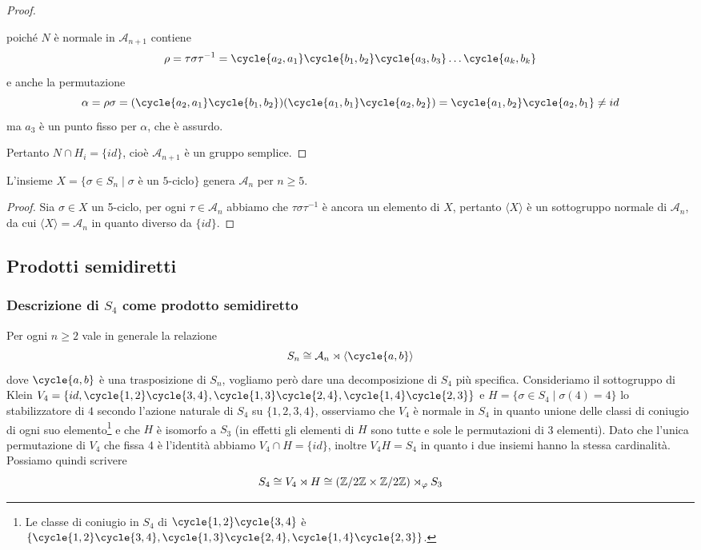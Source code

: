 \documentclass[11pt]{scrartcl}
\begin{document}
\begin{proof}
\begin{itemize}
        poiché $N$ è normale in $\mathcal{A}_{n + 1}$ contiene
        \[
            \rho = \tau\sigma\tau^{-1} = \cycle{a_2, a_1}\cycle{b_1, b_2}
            \cycle{a_3, b_3}\ldots\cycle{a_k, b_k}
        \]
        e anche la permutazione 
        \[
            \alpha = \rho\sigma = (\cycle{a_2, a_1}\cycle{b_1, b_2})
            (\cycle{a_1, b_1}\cycle{a_2, b_2}) = \cycle{a_1, b_2}\cycle{a_2, b_1} \neq id
        \]
        ma $a_3$ è un punto fisso per $\alpha$, che è assurdo.
    \end{itemize}
    Pertanto $N\cap H_i = \{id\}$, cioè $\mathcal{A}_{n + 1}$ è un gruppo semplice.
\end{proof}

\begin{corollary}
    L'insieme $X = \{\sigma \in S_n\mid \sigma \text{ è un 5-ciclo}\}$ genera
    $\mathcal{A}_n$ per $n \geqslant 5$.
\end{corollary}

\begin{proof}
    Sia $\sigma \in X$ un 5-ciclo, per ogni $\tau \in \mathcal{A}_n$
    abbiamo che $\tau\sigma\tau^{-1}$ è ancora un elemento di $X$, pertanto
    $\langle X\rangle$ è un sottogruppo normale di $\mathcal{A}_n$, da cui 
    $\langle X \rangle = \mathcal{A}_n$ in quanto diverso da $\{id\}$.
\end{proof}

\newpage

\subsection{Prodotti semidiretti}

\subsubsection{Descrizione di $S_4$ come prodotto semidiretto}

Per ogni $n \geq 2$ vale in generale la relazione 
\[
    S_n \cong \mathcal{A}_n \rtimes \langle\cycle{a, b}\rangle
\]
dove $\cycle{a, b}$ è una trasposizione di $S_n$, vogliamo però dare una
decomposizione di $S_4$ più specifica. \newline
Consideriamo il sottogruppo di Klein $V_4 = \{id, \cycle{1, 2}\cycle{3, 4}, \cycle{1, 3}\cycle{2, 4},
\cycle{1, 4}\cycle{2, 3}\}$ e $H = \{\sigma \in S_4\mid \sigma(4) = 4\}$ lo 
stabilizzatore di $4$ secondo l'azione naturale di $S_4$ su $\{1, 2, 3, 4\}$,
osserviamo che $V_4$ è normale in $S_4$ in quanto
unione delle classi di coniugio di ogni suo elemento\footnote{
    Le classe di coniugio in $S_4$ di $\cycle{1, 2}\cycle{3, 4}$ è 
    $\{\cycle{1, 2}\cycle{3, 4}, \cycle{1, 3}\cycle{2, 4}, \cycle{1, 4}\cycle{2, 3}\}$.
}
e che $H$ è isomorfo a $S_3$ (in effetti gli elementi di $H$ sono tutte e 
sole le permutazioni di 3 elementi). Dato che l'unica permutazione di $V_4$
che fissa 4 è l'identità abbiamo $V_4 \cap H = \{id\}$, inoltre $V_4H = S_4$
in quanto i due insiemi hanno la stessa cardinalità. Possiamo quindi scrivere
\[
    S_4 \cong V_4 \rtimes H \cong (\mathbb{Z}/{2}\mathbb{Z} \times \mathbb{Z}/{2}\mathbb{Z}) \rtimes_{\varphi} S_3
\]
\end{document}
